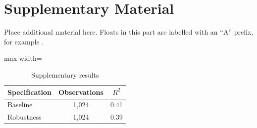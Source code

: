 \clearpage
{}
{}

\setcounter{figure}{0}
\setcounter{table}{0}
\setcounter{section}{0}
\setcounter{subsection}{0}

\renewcommand{\thefigure}{A\arabic{figure}}
\renewcommand{\thetable}{A\arabic{table}}
\renewcommand{\theHfigure}{appendix.figure.A\arabic{figure}}
\renewcommand{\theHtable}{appendix.table.A\arabic{table}}
\renewcommand{\thesection}{A\arabic{section}}
\renewcommand{\thesubsection}{A\arabic{section}.\arabic{subsection}}

\label{app:appendix}

\section{Supplementary Material}
\label{app:supplementary}

Place additional material here. Floats in this part are labelled with an
\enquote{A} prefix, for example .

\begin{table}[H]
\caption{Supplementary results}
\label{tab:appendix-example}
\centering
\normalsize
\begin{adjustbox}{max width=\textwidth}
\begin{tabular}{@{}lcc@{}}
\toprule
Specification & Observations & $R^2$ \\
\midrule
Baseline      & 1{,}024 & 0.41 \\
Robustness    & 1{,}024 & 0.39 \\
\bottomrule
\end{tabular}
\end{adjustbox}
\end{table}

